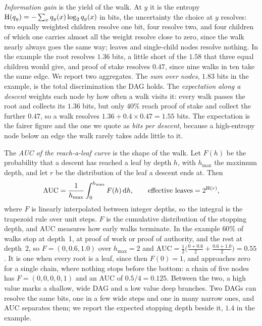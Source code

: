 \emph{Information gain} is the yield of the walk. At $y$ it is the entropy
$\operatorname{H}(q_y) = -\sum_x q_y(x) \log_2 q_y(x)$ in bits, the uncertainty the
choice at $y$ resolves: two equally weighted children resolve one bit, four
resolve two, and four children of which one carries almost all the weight
resolve close to zero, since the walk nearly always goes the same way; leaves
and single-child nodes resolve nothing. In the example the root resolves
$1.36$ bits, a little short of the $1.58$ that three equal children would
give, and proof of stake resolves $0.47$, since nine walks in ten take the
same edge. We report two aggregates. The \emph{sum over nodes}, $1.83$ bits in
the example, is the total discrimination the DAG holds. The \emph{expectation
along a descent} weights each node by how often a walk visits it: every walk
passes the root and collects its $1.36$ bits, but only $40\%$ reach proof of
stake and collect the further $0.47$, so a walk resolves $1.36 + 0.4 \times
0.47 = 1.55$ bits. The expectation is the fairer figure and the one we quote
as \emph{bits per descent}, because a high-entropy node below an edge the
walk rarely takes adds little to it.

The \emph{AUC of the reach-a-leaf curve} is the shape of the walk. Let $F(h)$
be the probability that a descent has reached a leaf by depth $h$, with
$h_{\max}$ the maximum depth, and let $r$ be the distribution of the leaf a
descent ends at. Then
\begin{equation}
  \mathrm{AUC} = \frac{1}{h_{\max}}\int_0^{h_{\max}} F(h)\,\mathrm{d}h,
  \qquad
  \text{effective leaves} = 2^{\operatorname{H}(r)},
  \label{eq:auc}
\end{equation}
where $F$ is linearly interpolated between integer depths, so the integral is
the trapezoid rule over unit steps. $F$ is the cumulative distribution of the
stopping depth, and AUC measures how early walks terminate. In the example
$60\%$ of walks stop at depth~1, at proof of work or proof of authority, and
the rest at depth~2, so $F = (0, 0.6, 1.0)$ over $h_{\max} = 2$ and
$\mathrm{AUC} = \tfrac{1}{2}\big(\tfrac{0 + 0.6}{2} + \tfrac{0.6 + 1.0}{2}\big)
= 0.55$. It is one when every root is a leaf, since then $F(0) = 1$, and
approaches zero for a single chain, where nothing stops before the bottom: a
chain of five nodes has $F = (0, 0, 0, 0, 1)$ and an AUC of $0.5 / 4 =
0.125$. Between the two, a high value marks a shallow, wide DAG and a low
value deep branches. Two DAGs can resolve the same bits, one in a few wide
steps and one in many narrow ones, and AUC separates them; we report the
expected stopping depth beside it, $1.4$ in the example.


